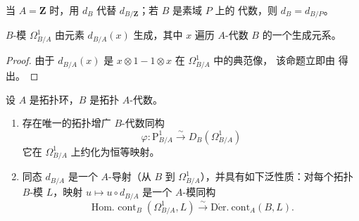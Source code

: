 当 $A=\mathbf{Z}$ 时，用 $d_B$ 代替 $d_{B/\mathbf{Z}}$；若 $B$ 是素域 $P$ 上的
代数，则 $d_B=d_{B/P}$。

\begin{proposition}[20.4.7]
\label{0.20.4.7-fr}
$B$-模 $\Omega^1_{B/A}$ 由元素 $d_{B/A}(x)$ 生成，其中 $x$ 遍历 $A$-代数
$B$ 的一个生成元系。
\end{proposition}

\begin{proof}
由于 $d_{B/A}(x)$ 是 $x\otimes1-1\otimes x$ 在 $\Omega^1_{B/A}$ 中的典范像，
该命题立即由  得出。
\end{proof}

\begin{theorem}[20.4.8]
\label{0.20.4.8-fr}
设 $A$ 是拓扑环，$B$ 是拓扑 $A$-代数。
\begin{enumerate}
  \item[\rm(i)] 存在唯一的拓扑增广 $B$-代数同构
\begin{equation}
\tag{20.4.8.1}
\label{0.20.4.8.1-fr}
  \varphi:\mathrm{P}^1_{B/A}\xrightarrow{\sim}D_B(\Omega^1_{B/A})
\end{equation}
  它在 $\Omega^1_{B/A}$ 上约化为恒等映射。
  \item[\rm(ii)] 同态 $d_{B/A}$ 是一个 $A$-导射（从 $B$ 到
  $\Omega^1_{B/A}$），并具有如下泛性质：对每个拓扑 $B$-模 $L$，映射
  $u\mapsto u\circ d_{B/A}$ 是一个 $A$-模同构
\begin{equation}
\tag{20.4.8.2}
\label{0.20.4.8.2-fr}
  \operatorname{Hom.\ cont}_B(\Omega^1_{B/A},L)
  \xrightarrow{\sim}\operatorname{D\acute{e}r.\ cont}_A(B,L).
\end{equation}
\end{enumerate}
\end{theorem}

